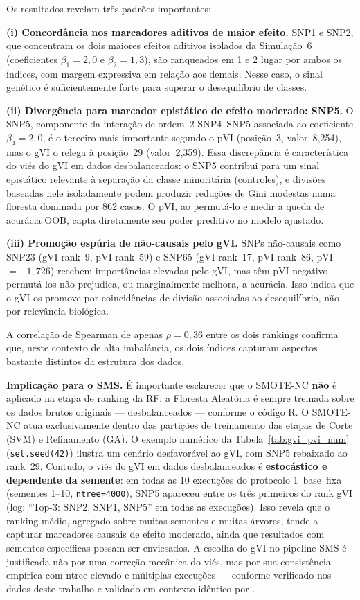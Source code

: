 \documentclass[
    12pt,
    a4paper,
    oneside,
    english,
    french,
    spanish,
    brazil
    ]{abntex2}
\newcommand{\novo}[1]{\textcolor{corNova}{#1}}
\begin{document}
\novo{Os resultados revelam três padrões importantes:}

\novo{\textbf{(i) Concordância nos marcadores aditivos de maior efeito.} SNP1 e SNP2, que concentram os dois maiores efeitos aditivos isolados da Simulação~6 (coeficientes $\beta_1=2{,}0$ e $\beta_2=1{,}3$), são ranqueados em 1\textordmasculine{} e 2\textordmasculine{} lugar por ambos os índices, com margem expressiva em relação aos demais. Nesse caso, o sinal genético é suficientemente forte para superar o desequilíbrio de classes.}

\novo{\textbf{(ii) Divergência para marcador epistático de efeito moderado: SNP5.} O SNP5, componente da interação de ordem~2 SNP4--SNP5 associada ao coeficiente $\beta_4=2{,}0$, é o terceiro mais importante segundo o pVI (posição~3, valor~8,254), mas o gVI o relega à posição~29 (valor~2,359). Essa discrepância é característica do viés do gVI em dados desbalanceados: o SNP5 contribui para um sinal epistático relevante à separação da classe minoritária (controles), e divisões baseadas nele isoladamente podem produzir reduções de Gini modestas numa floresta dominada por 862 casos. O pVI, ao permutá-lo e medir a queda de acurácia OOB, capta diretamente seu poder preditivo no modelo ajustado.}

\novo{\textbf{(iii) Promoção espúria de não-causais pelo gVI.} SNPs não-causais como SNP23 (gVI rank~9, pVI rank~59) e SNP65 (gVI rank~17, pVI rank~86, pVI~$=-1{,}726$) recebem importâncias elevadas pelo gVI, mas têm pVI negativo --- permutá-los não prejudica, ou marginalmente melhora, a acurácia. Isso indica que o gVI os promove por coincidências de divisão associadas ao desequilíbrio, não por relevância biológica.}

\novo{A correlação de Spearman de apenas $\rho = 0{,}36$ entre os dois rankings confirma que, neste contexto de alta imbalância, os dois índices capturam aspectos bastante distintos da estrutura dos dados.}

\novo{\textbf{Implicação para o SMS.} É importante esclarecer que o SMOTE-NC \textbf{não} é aplicado na etapa de ranking da RF: a Floresta Aleatória é sempre treinada sobre os dados brutos originais --- desbalanceados --- conforme o código R. O SMOTE-NC atua exclusivamente dentro das partições de treinamento das etapas de Corte (SVM) e Refinamento (GA). O exemplo numérico da Tabela~\ref{tab:gvi_pvi_num} (\texttt{set.seed(42)}) ilustra um cenário desfavorável ao gVI, com SNP5 rebaixado ao rank~29. Contudo, o viés do gVI em dados desbalanceados é \textbf{estocástico e dependente da semente}: em todas as 10 execuções do protocolo 1~base~fixa (sementes 1--10, \texttt{ntree=4000}), SNP5 apareceu entre os três primeiros do rank gVI (log: ``Top-3: SNP2, SNP1, SNP5'' em todas as execuções). Isso revela que o ranking médio, agregado sobre muitas sementes e muitas árvores, tende a capturar marcadores causais de efeito moderado, ainda que resultados com sementes específicas possam ser enviesados. A escolha do gVI no pipeline SMS é justificada não por uma correção mecânica do viés, mas por sua consistência empírica com ntree elevado e múltiplas execuções --- conforme verificado nos dados deste trabalho e validado em contexto idêntico por \citeonline{Oliveira2015}.}
\end{document}
